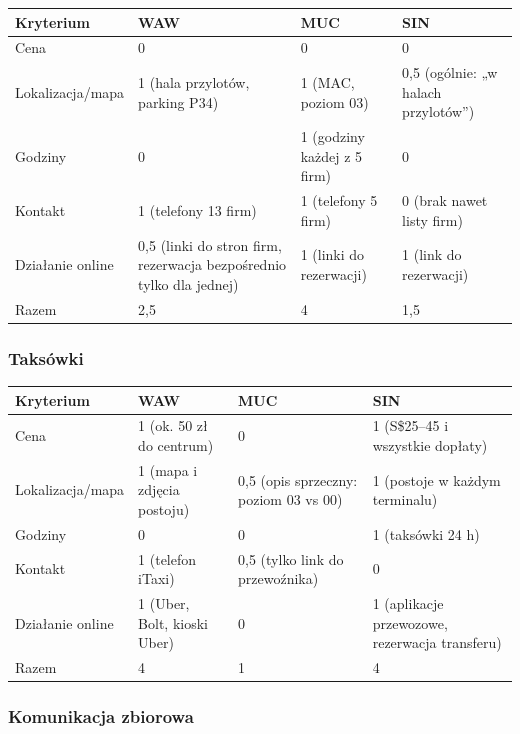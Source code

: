 \documentclass[11pt,a4paper]{article}
\begin{document}
{\small
\begin{tabularx}{\textwidth}{@{}L{2.8cm}YYY@{}}
\toprule
Kryterium & WAW & MUC & SIN \\
\midrule
Cena & 0 & 0 & 0 \\
Lokalizacja/mapa & 1 (hala przylotów, parking P34) & 1 (MAC, poziom 03) & 0,5 (ogólnie: „w halach przylotów”) \\
Godziny & 0 & 1 (godziny każdej z 5 firm) & 0 \\
Kontakt & 1 (telefony 13 firm) & 1 (telefony 5 firm) & 0 (brak nawet listy firm) \\
Działanie online & 0,5 (linki do stron firm, rezerwacja bezpośrednio tylko dla jednej) & 1 (linki do rezerwacji) & 1 (link do rezerwacji) \\
\midrule
Razem & 2,5 & 4 & 1,5 \\
\bottomrule
\end{tabularx}
}

\subsubsection*{Taksówki}

{\small
\begin{tabularx}{\textwidth}{@{}L{2.8cm}YYY@{}}
\toprule
Kryterium & WAW & MUC & SIN \\
\midrule
Cena & 1 (ok. 50 zł do centrum) & 0 & 1 (S\$25--45 i wszystkie dopłaty) \\
Lokalizacja/mapa & 1 (mapa i zdjęcia postoju) & 0,5 (opis sprzeczny: poziom 03 vs 00) & 1 (postoje w każdym terminalu) \\
Godziny & 0 & 0 & 1 (taksówki 24 h) \\
Kontakt & 1 (telefon iTaxi) & 0,5 (tylko link do przewoźnika) & 0 \\
Działanie online & 1 (Uber, Bolt, kioski Uber) & 0 & 1 (aplikacje przewozowe, rezerwacja transferu) \\
\midrule
Razem & 4 & 1 & 4 \\
\bottomrule
\end{tabularx}
}

\subsubsection*{Komunikacja zbiorowa}
\end{document}
